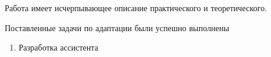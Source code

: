 
Работа имеет исчерпывающее описание практического и теоретического.

Поставленные задачи по адаптации были успешно выполнены \begin{enumerate}
    \item Разработка ассистента
\end{enumerate}